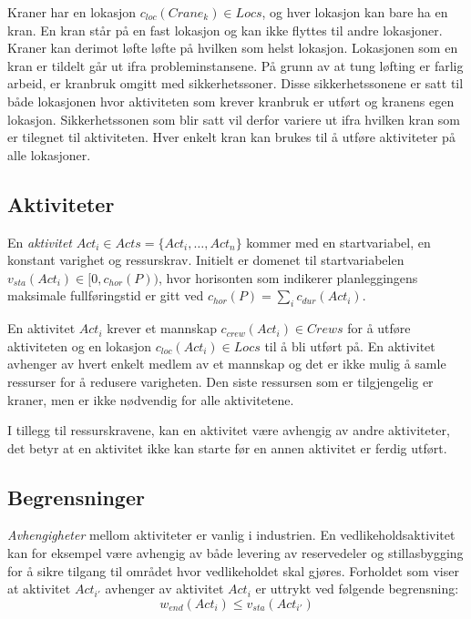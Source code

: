 Kraner har en lokasjon $ c_{loc}(Crane_{k}) \in Locs $, og hver lokasjon kan bare ha en kran. En kran står på en fast lokasjon og kan ikke flyttes til andre lokasjoner. Kraner kan derimot løfte løfte på hvilken som helst lokasjon. Lokasjonen som en kran er tildelt går ut ifra probleminstansene. På grunn av at tung løfting er farlig arbeid, er kranbruk omgitt med sikkerhetssoner. Disse sikkerhetssonene er satt til både lokasjonen hvor aktiviteten som krever kranbruk er utført og kranens egen lokasjon. Sikkerhetssonen som blir satt vil derfor variere ut ifra hvilken kran som er tilegnet til aktiviteten. Hver enkelt kran kan brukes til å utføre aktiviteter på alle lokasjoner.

\subsection{Aktiviteter}
En \textit{aktivitet} $ Act_{i} \in Acts = \{ Act_{i},\dots,Act_{n} \} $ kommer med en startvariabel, en konstant varighet og ressurskrav. Initielt er domenet til startvariabelen $ v_{sta}(Act_{i}) \in [ 0, c_{hor}(P)) $, hvor horisonten som indikerer planleggingens maksimale fullføringstid er gitt ved $ c_{hor}(P) = \sum_{i} c_{dur}(Act_{i}) $.

En aktivitet $ Act_{i} $ krever et mannskap $ c_{crew}(Act_{i}) \in Crews $ for å utføre aktiviteten og en lokasjon $ c_{loc}(Act_{i}) \in Locs $ til å bli utført på. En aktivitet avhenger av hvert enkelt medlem av et mannskap og det er ikke mulig å samle ressurser for å redusere varigheten. Den siste ressursen som er tilgjengelig er kraner, men er ikke nødvendig for alle aktivitetene.

I tillegg til ressurskravene, kan en aktivitet være avhengig av andre aktiviteter, det betyr at en aktivitet ikke kan starte før en annen aktivitet er ferdig utført.

\subsection{Begrensninger}
\textit{Avhengigheter} mellom aktiviteter er vanlig i industrien. En vedlikeholdsaktivitet kan for eksempel være avhengig av både levering av reservedeler og stillasbygging for å sikre tilgang til området hvor vedlikeholdet skal gjøres. Forholdet som viser at aktivitet $ Act_{i'} $ avhenger av aktivitet $ Act_{i} $ er uttrykt ved følgende begrensning: 
\begin{equation}
w_{end}(Act_{i}) \leq v_{sta}(Act_{i'})
\end{equation}

